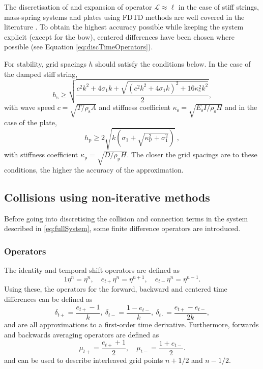 \documentclass[dvipsnames, pdftex]{article}
\begin{document}
 
The discretisation of and expansion of operator $\mathcal{L}\approx \ell$ in the case of stiff strings, mass-spring systems and plates using FDTD methods are well covered in the literature \cite{Bilbao2009:NumericalSoundSynthesis}. To obtain the highest accuracy possible while keeping the system explicit (except for the bow), centered differences have been chosen where possible (see Equation \eqref{eq:discTimeOperators}). 

For stability, grid spacings $h$ should satisfy the conditions below. In the case of the damped stiff string,
\begin{equation}
    h_\text{s} \geq \sqrt{\frac{c^2k^2+4\sigma_1k+\sqrt{(c^2k^2+4\sigma_1k)^2+16\kappa_\text{s}^2k^2}}{2}},
\end{equation}
with wave speed $c = \sqrt{T/\rho_\text{s}A}$ and stiffness coefficient $\kappa_\text{s} = \sqrt{E_\text{s}I/\rho_\text{s}H}$ and in the case of the plate,
\begin{equation}\label{eq:gridSpacingPlate}
    h_\text{p} \geq 2\sqrt{k\left(\sigma_1 + \sqrt{\kappa_\text{P}^2 + \sigma_1^2}\right)}\ ,
\end{equation}
with stiffness coefficient $\kappa_\text{p} = \sqrt{D/\rho_\text{p}H}$. The closer the grid spacings are to these conditions, the higher the accuracy of the approximation. 
\subsection{Collisions using non-iterative methods}
Before going into discretising the collision and connection terms in the system described in \eqref{eq:fullSystem}, some finite difference operators are introduced.
\subsubsection{Operators}
The identity and temporal shift operators are defined as
\begin{equation}
    1\eta^n = \eta^n, \quad e_{t+}\eta^n = \eta^{n+1}, \quad e_{t-}\eta^n = \eta^{n-1}.
\end{equation}
Using these, the operators for the forward, backward and centered time differences can be defined as
\begin{equation}\label{eq:discTimeOperators}
    \delta_{t+} = \frac{e_{t+} - 1}{k},\ \delta_{t-} = \frac{1 - e_{t-}}{k},\ \delta_{t\cdot} = \frac{e_{t+}-e_{t-}}{2k},
\end{equation}
and are all approximations to a first-order time derivative. Furthermore, forwards and backwards averaging operators are defined as
\begin{equation}
    \mu_{t+} = \frac{e_{t+} + 1}{2}, \quad \mu_{t-} = \frac{1 + e_{t-}}{2}.
\end{equation}
and can be used to describe interleaved grid points $n+1/2$ and $n-1/2$.
\end{document}
